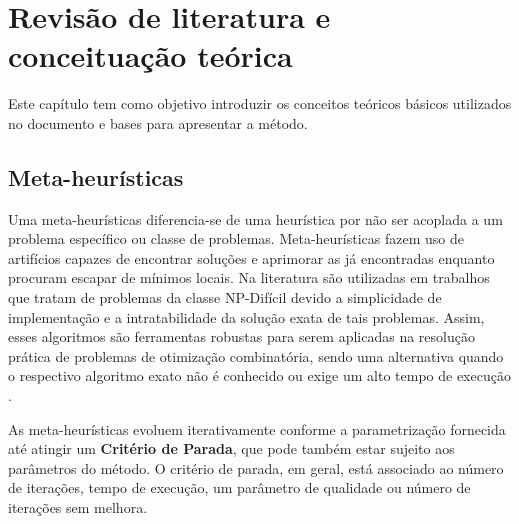 \chapter{Revisão de literatura e conceituação teórica} \label{cap:conceitos}

Este capítulo tem como objetivo introduzir os conceitos teóricos básicos utilizados no documento e bases para apresentar a método.










\section{Meta-heurísticas} \label{sec:metaHeuristicas}

Uma meta-heurísticas diferencia-se de uma heurística por não ser acoplada a um problema específico ou classe de problemas.
Meta-heurísticas fazem uso de artifícios capazes de encontrar soluções e aprimorar as já encontradas enquanto procuram escapar de mínimos locais.
Na literatura são utilizadas em trabalhos que tratam de problemas da classe NP-Difícil devido a simplicidade de implementação e a intratabilidade da solução exata de tais problemas.
Assim, esses algoritmos são ferramentas robustas para serem aplicadas na resolução prática de problemas de otimização combinatória, sendo uma alternativa quando o respectivo algoritmo exato não é conhecido ou exige um alto tempo de execução \cite{glover2006handbook}.

As meta-heurísticas evoluem iterativamente conforme a parametrização fornecida até atingir um \textbf{Critério de Parada}, que pode também estar sujeito aos parâmetros do método.
O critério de parada, em geral, está associado ao número de iterações, tempo de execução, um parâmetro de qualidade ou número de iterações sem melhora.







